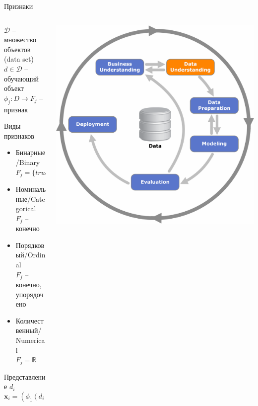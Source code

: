\documentclass[10pt]{beamer}
\begin{document}
\begin{frame}{Признаки}

\begin{columns}[C]
    \begin{column}{.5\textwidth}
    $\mathcal{D}$ -- множество объектов (data set) \\
    $d \in \mathcal{D}$ -- обучающий объект \\
    $\phi_j: D \rightarrow F_j$ -- признак
    
    \vspace{1em}
    Виды признаков
    \begin{itemize}
    \item Бинарные/Binary \\ $F_j = \{true, false\}$
	\item Номинальные/Categorical \\ $F_j$ -- конечно
	\item Порядковый/Ordinal \\ $F_j$ -- конечно, упорядочено
	\item Количественный/Numerical \\ $F_j = \mathbb{R}$
    \end{itemize}
    \vspace{1em}
    Представление $d_i$
    \[
    \mathbf{x}_i = (\phi_1(d_i), \ldots, \phi_n(d_i)) \in \mathcal{X}
    \]

    \end{column}
       
    \begin{column}{.5\textwidth}
    \vspace{-0em}
	\begin{center}
   		\includegraphics[width=\textwidth]{images/crisp-du.png}
    \end{center}
    \end{column}
  \end{columns}

\end{frame}
\end{document}
